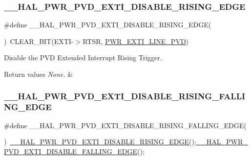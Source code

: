 \subsubsection{\texorpdfstring{\_\_HAL\_PWR\_PVD\_EXTI\_DISABLE\_RISING\_EDGE}{\_\_HAL\_PWR\_PVD\_EXTI\_DISABLE\_RISING\_EDGE}}
{\footnotesize\ttfamily \#define \+\_\+\+\_\+\+H\+A\+L\+\_\+\+P\+W\+R\+\_\+\+P\+V\+D\+\_\+\+E\+X\+T\+I\+\_\+\+D\+I\+S\+A\+B\+L\+E\+\_\+\+R\+I\+S\+I\+N\+G\+\_\+\+E\+D\+GE(\begin{DoxyParamCaption}{ }\end{DoxyParamCaption})~C\+L\+E\+A\+R\+\_\+\+B\+IT(E\+X\+TI-\/$>$R\+T\+SR, \mbox{\hyperlink{group___p_w_r___p_v_d___e_x_t_i___line_ga43a49255649e03d2d2b6b12c5c379d2b}{P\+W\+R\+\_\+\+E\+X\+T\+I\+\_\+\+L\+I\+N\+E\+\_\+\+P\+VD}})}



Disable the P\+VD Extended Interrupt Rising Trigger. 


\begin{DoxyRetVals}{Return values}
{\em None.} & \\
\hline
\end{DoxyRetVals}
\mbox{\label{group___p_w_r___exported___macro_ga3f66c9c0c214cd08c24674904dcdc4e0}} 
\subsubsection{\texorpdfstring{\_\_HAL\_PWR\_PVD\_EXTI\_DISABLE\_RISING\_FALLING\_EDGE}{\_\_HAL\_PWR\_PVD\_EXTI\_DISABLE\_RISING\_FALLING\_EDGE}}
{\footnotesize\ttfamily \#define \+\_\+\+\_\+\+H\+A\+L\+\_\+\+P\+W\+R\+\_\+\+P\+V\+D\+\_\+\+E\+X\+T\+I\+\_\+\+D\+I\+S\+A\+B\+L\+E\+\_\+\+R\+I\+S\+I\+N\+G\+\_\+\+F\+A\+L\+L\+I\+N\+G\+\_\+\+E\+D\+GE(\begin{DoxyParamCaption}{ }\end{DoxyParamCaption})~\mbox{\hyperlink{group___p_w_r___exported___macro_ga1ca8fd7f3286a176f6be540c75a004c6}{\+\_\+\+\_\+\+H\+A\+L\+\_\+\+P\+W\+R\+\_\+\+P\+V\+D\+\_\+\+E\+X\+T\+I\+\_\+\+D\+I\+S\+A\+B\+L\+E\+\_\+\+R\+I\+S\+I\+N\+G\+\_\+\+E\+D\+GE}}();\mbox{\hyperlink{group___p_w_r___exported___macro_ga1ca57168205f8cd8d1014e6eb9465f2d}{\+\_\+\+\_\+\+H\+A\+L\+\_\+\+P\+W\+R\+\_\+\+P\+V\+D\+\_\+\+E\+X\+T\+I\+\_\+\+D\+I\+S\+A\+B\+L\+E\+\_\+\+F\+A\+L\+L\+I\+N\+G\+\_\+\+E\+D\+GE}}();}



